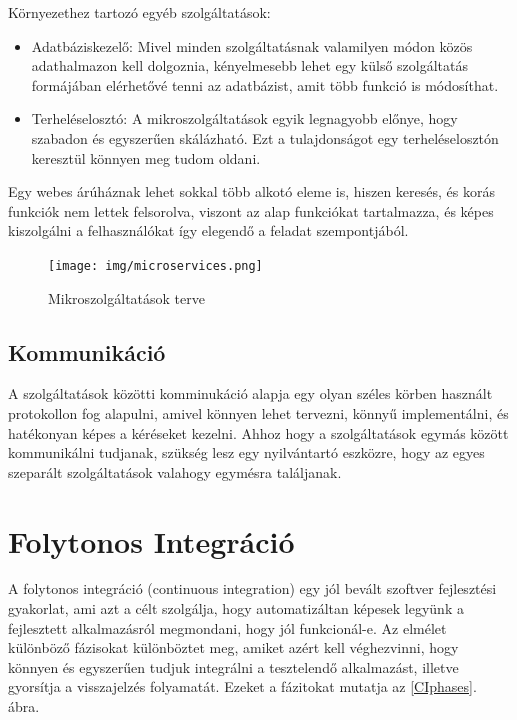 \documentclass[11pt,magyar,a4paper,twoside,]{report}
\providecommand{\tightlist}{%
  \setlength{\itemsep}{0pt}\setlength{\parskip}{0pt}}
\begin{document}
Környezethez tartozó egyéb szolgáltatások:

\begin{itemize}
\tightlist
\item
  Adatbáziskezelő: Mivel minden szolgáltatásnak valamilyen módon közös
  adathalmazon kell dolgoznia, kényelmesebb lehet egy külső szolgáltatás
  formájában elérhetővé tenni az adatbázist, amit több funkció is
  módosíthat.
\item
  Terheléselosztó: A mikroszolgáltatások egyik legnagyobb előnye, hogy
  szabadon és egyszerűen skálázható. Ezt a tulajdonságot egy
  terheléselosztón keresztül könnyen meg tudom oldani.
\end{itemize}

Egy webes árúháznak lehet sokkal több alkotó eleme is, hiszen keresés,
és korás funkciók nem lettek felsorolva, viszont az alap funkciókat
tartalmazza, és képes kiszolgálni a felhasználókat így elegendő a
feladat szempontjából.

\begin{figure}[H]
\centering
\texttt{[image: img/microservices.png]}
\caption{Mikroszolgáltatások terve}
\end{figure}

\subsection{Kommunikáció}\label{kommunikuxe1ciuxf3}

A szolgáltatások közötti komminukáció alapja egy olyan széles körben
használt protokollon fog alapulni, amivel könnyen lehet tervezni, könnyű
implementálni, és hatékonyan képes a kéréseket kezelni. Ahhoz hogy a
szolgáltatások egymás között kommunikálni tudjanak, szükség lesz egy
nyilvántartó eszközre, hogy az egyes szeparált szolgáltatások valahogy
egymésra találjanak.

\section{Folytonos Integráció}\label{folytonos-integruxe1ciuxf3}

A folytonos integráció\citep{continuous-integration} (continuous
integration) egy jól bevált szoftver fejlesztési gyakorlat, ami azt a
célt szolgálja, hogy automatizáltan képesek legyünk a fejlesztett
alkalmazásról megmondani, hogy jól funkcionál-e. Az elmélet különböző
fázisokat különböztet meg, amiket azért kell véghezvinni, hogy könnyen
és egyszerűen tudjuk integrálni a tesztelendő alkalmazást, illetve
gyorsítja a visszajelzés folyamatát. Ezeket a fázitokat mutatja az
\ref{CIphases}. ábra.
\end{document}

